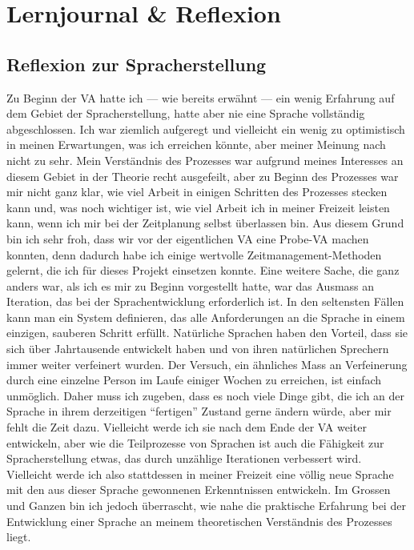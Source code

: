 \documentclass{article}
\begin{document}
\section{Lernjournal \& Reflexion}
\subsection{Reflexion zur Spracherstellung}
Zu Beginn der VA hatte ich --- wie bereits erwähnt --- ein wenig Erfahrung auf dem Gebiet der Spracherstellung,
hatte aber nie eine Sprache vollständig abgeschlossen. Ich war ziemlich aufgeregt und vielleicht ein wenig
zu optimistisch in meinen Erwartungen, was ich erreichen könnte, aber meiner Meinung nach nicht zu sehr.
Mein Verständnis des Prozesses war aufgrund meines Interesses an diesem Gebiet in der Theorie recht ausgefeilt,
aber zu Beginn des Prozesses war mir nicht ganz klar, wie viel Arbeit in einigen Schritten des Prozesses stecken
kann und, was noch wichtiger ist, wie viel Arbeit ich in meiner Freizeit leisten kann,
wenn ich mir bei der Zeitplanung selbst überlassen bin. Aus diesem Grund bin ich sehr froh,
dass wir vor der eigentlichen VA eine Probe-VA machen konnten, denn dadurch habe ich einige wertvolle
Zeitmanagement-Methoden gelernt, die ich für dieses Projekt einsetzen konnte. Eine weitere Sache,
die ganz anders war, als ich es mir zu Beginn vorgestellt hatte,
war das Ausmass an Iteration, das bei der Sprachentwicklung erforderlich ist.
In den seltensten Fällen kann man ein System definieren, das alle Anforderungen an die Sprache in einem einzigen,
sauberen Schritt erfüllt. Natürliche Sprachen haben den Vorteil, dass sie sich über Jahrtausende entwickelt
haben und von ihren natürlichen Sprechern immer weiter verfeinert wurden. Der Versuch,
ein ähnliches Mass an Verfeinerung durch eine einzelne Person im Laufe einiger Wochen zu erreichen,
ist einfach unmöglich. Daher muss ich zugeben, dass es noch viele Dinge gibt,
die ich an der Sprache in ihrem derzeitigen ``fertigen'' Zustand gerne ändern würde,
aber mir fehlt die Zeit dazu. Vielleicht werde ich sie nach dem Ende der VA weiter entwickeln,
aber wie die Teilprozesse von Sprachen ist auch die Fähigkeit zur Spracherstellung etwas,
das durch unzählige Iterationen verbessert wird. Vielleicht werde ich also stattdessen in meiner
Freizeit eine völlig neue Sprache mit den aus dieser Sprache gewonnenen Erkenntnissen entwickeln.
Im Grossen und Ganzen bin ich jedoch überrascht, wie nahe die praktische Erfahrung bei der Entwicklung
einer Sprache an meinem theoretischen Verständnis des Prozesses liegt.
\end{document}
